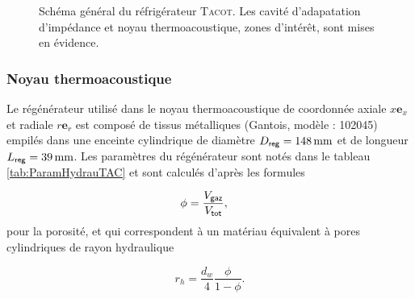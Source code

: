 \begin{figure}[!ht]
    \centering
    
    \caption[Schéma général du réfrigérateur \textsc{Tacot} et mise en évidence des zones d'intérêt pour cette thèse]{Schéma général du réfrigérateur \textsc{Tacot}. Les \colorbox{MatlabYellow}{cavité d'adapatation d'impédance} et \colorbox{MatlabOrange}{noyau thermoacoustique}, zones d'intérêt, sont mises en évidence.}
    \label{fig:SchemaGeneralTACOT}
\end{figure}



\subsubsection{Noyau thermoacoustique}

Le régénérateur utilisé dans le noyau thermoacoustique de coordonnée axiale $x \mathbf e_x$ et radiale $r \mathbf e_r$ est composé de tissus métalliques (Gantois, modèle : 102045) empilés dans une enceinte cylindrique de diamètre $D_{\sf reg}=\qty{148}{\mm}$ et de longueur $L_{\sf reg}=\qty{39}{\mm}$. Les paramètres du régénérateur sont notés dans le tableau \ref{tab:ParamHydrauTAC} et sont calculés d'après les formules 

\begin{align}
	\phi &= \frac{V_{\sf gaz}}{V_{\sf tot}}, \label{eq:Porosite_Volume}%
\end{align}
pour la porosité, et qui correspondent à un matériau équivalent à pores cylindriques de rayon hydraulique

\begin{equation}
	r_h = \frac{d_w}{4}\frac{\phi}{1-\phi}.
	\label{eq:DefRayonHydrauGantois}
\end{equation}

